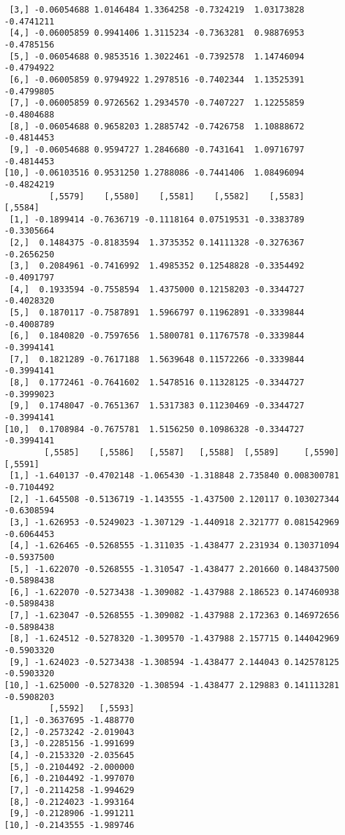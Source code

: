 \documentclass[
  letterpaper,
  DIV=11,
  numbers=noendperiod]{scrreprt}
\begin{document}
\begin{verbatim}
 [3,] -0.06054688 1.0146484 1.3364258 -0.7324219  1.03173828 -0.4741211
 [4,] -0.06005859 0.9941406 1.3115234 -0.7363281  0.98876953 -0.4785156
 [5,] -0.06054688 0.9853516 1.3022461 -0.7392578  1.14746094 -0.4794922
 [6,] -0.06005859 0.9794922 1.2978516 -0.7402344  1.13525391 -0.4799805
 [7,] -0.06005859 0.9726562 1.2934570 -0.7407227  1.12255859 -0.4804688
 [8,] -0.06054688 0.9658203 1.2885742 -0.7426758  1.10888672 -0.4814453
 [9,] -0.06054688 0.9594727 1.2846680 -0.7431641  1.09716797 -0.4814453
[10,] -0.06103516 0.9531250 1.2788086 -0.7441406  1.08496094 -0.4824219
         [,5579]    [,5580]    [,5581]    [,5582]    [,5583]    [,5584]
 [1,] -0.1899414 -0.7636719 -0.1118164 0.07519531 -0.3383789 -0.3305664
 [2,]  0.1484375 -0.8183594  1.3735352 0.14111328 -0.3276367 -0.2656250
 [3,]  0.2084961 -0.7416992  1.4985352 0.12548828 -0.3354492 -0.4091797
 [4,]  0.1933594 -0.7558594  1.4375000 0.12158203 -0.3344727 -0.4028320
 [5,]  0.1870117 -0.7587891  1.5966797 0.11962891 -0.3339844 -0.4008789
 [6,]  0.1840820 -0.7597656  1.5800781 0.11767578 -0.3339844 -0.3994141
 [7,]  0.1821289 -0.7617188  1.5639648 0.11572266 -0.3339844 -0.3994141
 [8,]  0.1772461 -0.7641602  1.5478516 0.11328125 -0.3344727 -0.3999023
 [9,]  0.1748047 -0.7651367  1.5317383 0.11230469 -0.3344727 -0.3994141
[10,]  0.1708984 -0.7675781  1.5156250 0.10986328 -0.3344727 -0.3994141
        [,5585]    [,5586]   [,5587]   [,5588]  [,5589]     [,5590]    [,5591]
 [1,] -1.640137 -0.4702148 -1.065430 -1.318848 2.735840 0.008300781 -0.7104492
 [2,] -1.645508 -0.5136719 -1.143555 -1.437500 2.120117 0.103027344 -0.6308594
 [3,] -1.626953 -0.5249023 -1.307129 -1.440918 2.321777 0.081542969 -0.6064453
 [4,] -1.626465 -0.5268555 -1.311035 -1.438477 2.231934 0.130371094 -0.5937500
 [5,] -1.622070 -0.5268555 -1.310547 -1.438477 2.201660 0.148437500 -0.5898438
 [6,] -1.622070 -0.5273438 -1.309082 -1.437988 2.186523 0.147460938 -0.5898438
 [7,] -1.623047 -0.5268555 -1.309082 -1.437988 2.172363 0.146972656 -0.5898438
 [8,] -1.624512 -0.5278320 -1.309570 -1.437988 2.157715 0.144042969 -0.5903320
 [9,] -1.624023 -0.5273438 -1.308594 -1.438477 2.144043 0.142578125 -0.5903320
[10,] -1.625000 -0.5278320 -1.308594 -1.438477 2.129883 0.141113281 -0.5908203
         [,5592]   [,5593]
 [1,] -0.3637695 -1.488770
 [2,] -0.2573242 -2.019043
 [3,] -0.2285156 -1.991699
 [4,] -0.2153320 -2.035645
 [5,] -0.2104492 -2.000000
 [6,] -0.2104492 -1.997070
 [7,] -0.2114258 -1.994629
 [8,] -0.2124023 -1.993164
 [9,] -0.2128906 -1.991211
[10,] -0.2143555 -1.989746
\end{verbatim}
\end{document}
